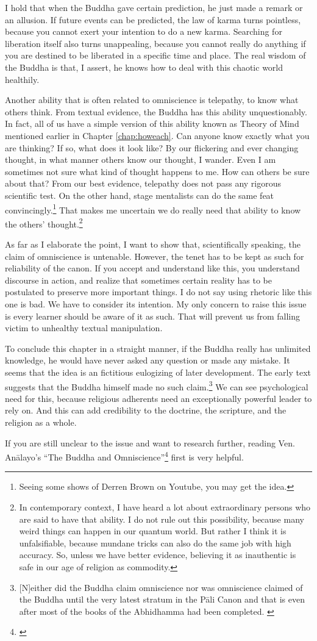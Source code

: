 I hold that when the Buddha gave certain prediction, he just made a remark or an allusion. If future events can be predicted, the law of karma turns pointless, because you cannot exert your intention to do a new karma. Searching for liberation itself also turns unappealing, because you cannot really do anything if you are destined to be liberated in a specific time and place. The real wisdom of the Buddha is that, I assert, he knows how to deal with this chaotic world healthily.

Another ability that is often related to omniscience is telepathy, to know what others think. From textual evidence, the Buddha has this ability unquestionably. In fact, all of us have a simple version of this ability known as Theory of Mind mentioned earlier in Chapter \ref{chap:howeach}. Can anyone know exactly what you are thinking? If so, what does it look like? By our flickering and ever changing thought, in what manner others know our thought, I wander. Even I am sometimes not sure what kind of thought happens to me. How can others be sure about that? From our best evidence, telepathy does not pass any rigorous scientific test. On the other hand, stage mentalists can do the same feat convincingly.\footnote{Seeing some shows of Derren Brown on Youtube, you may get the idea.} That makes me uncertain we do really need that ability to know the others' thought.\footnote{In contemporary context, I have heard a lot about extraordinary persons who are said to have that ability. I do not rule out this possibility, because many weird things can happen in our quantum world. But rather I think it is unfalsifiable, because mundane tricks can also do the same job with high accuracy. So, unless we have better evidence, believing it as inauthentic is safe in our age of religion as commodity.}

As far as I elaborate the point, I want to show that, scientifically speaking, the claim of omniscience is untenable. However, the tenet has to be kept as such for reliability of the canon. If you accept and understand like this, you understand discourse in action, and realize that sometimes certain reality has to be postulated to preserve more important things. I do not say using rhetoric like this one is bad. We have to consider its intention. My only concern to raise this issue is every learner should be aware of it as such. That will prevent us from falling victim to unhealthy textual manipulation.

To conclude this chapter in a straight manner, if the Buddha really has unlimited knowledge, he would have never asked any question or made any mistake. It seems that the idea is an fictitious eulogizing of later development. The early text suggests that the Buddha himself made no such claim.\footnote{[N]either did the Buddha claim omniscience nor was omniscience claimed of the Buddha until the very latest stratum in the P\=ali Canon and that is even after most of the books of the Abhidhamma had been completed. \citep[p.~381]{jayatilleke:knowledge}} We can see psychological need for this, because religious adherents need an exceptionally powerful leader to rely on. And this can add credibility to the doctrine, the scripture, and the religion as a whole.

If you are still unclear to the issue and want to research further, reading Ven.\,An\=alayo's ``The Buddha and Omniscience''\footnote{\citealp{analayo:omniscience}} first is very helpful.
